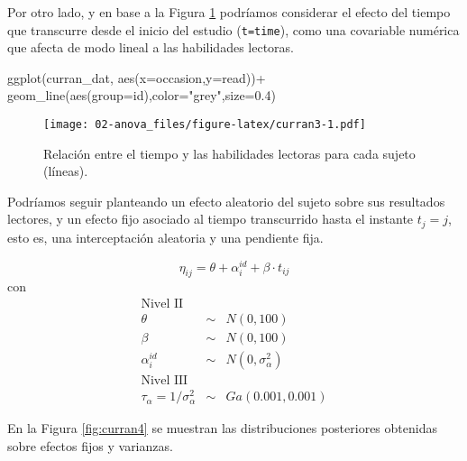 \documentclass[
]{book}
\newenvironment{Shaded}{\begin{snugshade}}{\end{snugshade}}
\newcommand{\AttributeTok}[1]{\textcolor[rgb]{0.77,0.63,0.00}{#1}}
\newcommand{\FloatTok}[1]{\textcolor[rgb]{0.00,0.00,0.81}{#1}}
\newcommand{\FunctionTok}[1]{\textcolor[rgb]{0.00,0.00,0.00}{#1}}
\newcommand{\NormalTok}[1]{#1}
\newcommand{\SpecialCharTok}[1]{\textcolor[rgb]{0.00,0.00,0.00}{#1}}
\newcommand{\StringTok}[1]{\textcolor[rgb]{0.31,0.60,0.02}{#1}}
\begin{document}
Por otro lado, y en base a la Figura \ref{fig:curran3} podríamos considerar el efecto del tiempo que transcurre desde el inicio del estudio (\texttt{t=time}), como una covariable numérica que afecta de modo lineal a las habilidades lectoras.

\begin{Shaded}
\begin{Highlighting}[]
\FunctionTok{ggplot}\NormalTok{(curran\_dat, }\FunctionTok{aes}\NormalTok{(}\AttributeTok{x=}\NormalTok{occasion,}\AttributeTok{y=}\NormalTok{read))}\SpecialCharTok{+}
  \FunctionTok{geom\_line}\NormalTok{(}\FunctionTok{aes}\NormalTok{(}\AttributeTok{group=}\NormalTok{id),}\AttributeTok{color=}\StringTok{"grey"}\NormalTok{,}\AttributeTok{size=}\FloatTok{0.4}\NormalTok{)}
\end{Highlighting}
\end{Shaded}

\begin{figure}
\centering
\texttt{[image: 02-anova\_files/figure-latex/curran3-1.pdf]}
\caption{\label{fig:curran3}Relación entre el tiempo y las habilidades lectoras para cada sujeto (líneas).}
\end{figure}

Podríamos seguir planteando un efecto aleatorio del sujeto sobre sus resultados lectores, y un efecto fijo asociado al tiempo transcurrido hasta el instante \(t_j=j\), esto es, una interceptación aleatoria y una pendiente fija.

\[\eta_{ij}=\theta + \alpha_i^{id} + \beta \cdot t_{ij} \]
con
\begin{eqnarray*}
\text{Nivel II} && \\
\theta &\sim & N(0,100) \\
\beta &\sim& N(0,100) \\
\alpha_i^{id} &\sim& N(0,\sigma_{\alpha}^2) \\
\text{Nivel III} && \\
\tau_{\alpha}=1/\sigma_{\alpha}^2 &\sim& Ga(0.001,0.001) 
\end{eqnarray*}

En la Figura \ref{fig:curran4} se muestran las distribuciones posteriores obtenidas sobre efectos fijos y varianzas.
\end{document}
